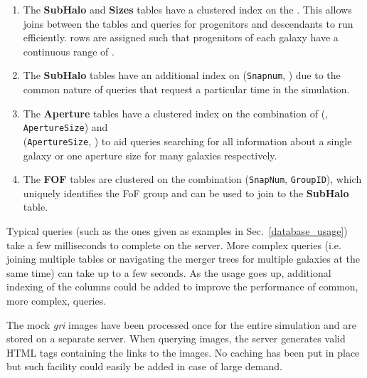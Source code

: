 \begin{enumerate}

\item The \textbf{SubHalo} and \textbf{Sizes} tables have a clustered index on
  the \GalaxyID. This allows joins between the tables and queries for
  progenitors and descendants to run efficiently. \GalaxyID rows are assigned
  such that progenitors of each galaxy have a continuous range of \GalaxyID.

\item The \textbf{SubHalo} tables have an additional index on (\texttt{Snapnum},
  \GalaxyID) due to the common nature of queries that request a particular time
  in the simulation.

\item The \textbf{Aperture} tables have a clustered index on the combination of
  (\GalaxyID, \texttt{ApertureSize}) and \\(\texttt{ApertureSize}, \GalaxyID) to
  aid queries searching for all information about a single galaxy or one
  aperture size for many galaxies respectively.

\item The \textbf{FOF} tables are clustered on the combination
  (\texttt{SnapNum}, \texttt{GroupID}), which uniquely identifies the FoF group
  and can be used to join to the \textbf{SubHalo} table.

\end{enumerate}

Typical queries (such as the ones given as examples in
Sec.~\ref{database_usage}) take a few milliseconds to complete on the
server.  More complex queries (i.e. joining multiple tables or
navigating the merger trees for multiple galaxies at the same time)
can take up to a few seconds. As the usage goes up, additional
indexing of the columns could be added to improve the performance of
common, more complex, queries.

The mock \emph{gri} images have been processed once for the entire simulation
and are stored on a separate server. When querying images, the \sql server
generates valid HTML tags containing the links to the images. No caching has
been put in place but such facility could easily be added in case of large
demand.





